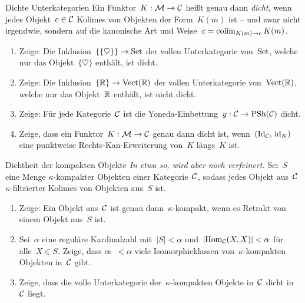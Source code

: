 \documentclass{uebblatt}
\begin{document}

\begin{aufgabe}{Dichte Unterkategorien}
Ein Funktor~$K : \mathcal{M} \to \mathcal{C}$ heißt genau dann \emph{dicht}, wenn jedes Objekt~$c
\in \mathcal{C}$ Kolimes von Objekten der Form~$K(m)$ ist -- und zwar nicht irgendwie,
sondern auf die kanonische Art und Weise~$c = \operatorname*{colim}_{K(m) \to c} K(m)$.
\begin{enumerate}
\item Zeige: Die Inklusion~$\{\{\heartsuit\}\} \to \mathrm{Set}$ der vollen
Unterkategorie von~$\mathrm{Set}$, welche nur das Objekt~$\{\heartsuit\}$ enthält, ist
dicht.
\item Zeige: Die Inklusion~$\{\mathbb{R}\} \to \mathrm{Vect}(\mathbb{R})$ der vollen
Unterkategorie von~$\mathrm{Vect}(\mathbb{R})$, welche nur das Objekt~$\mathbb{R}$ enthält, ist
nicht dicht.
\item Zeige: Für jede Kategorie~$\mathcal{C}$ ist die Yoneda-Einbettung~$y : \mathcal{C} \to
\mathrm{PSh}(\mathcal{C})$ dicht.
\item Zeige, dass ein Funktor~$K : \mathcal{M} \to \mathcal{C}$ genau dann dicht ist,
wenn~$(\mathrm{Id}_{\mathcal{C}},\,\mathrm{id}_K)$ eine punktweise Rechts-Kan-Erweiterung von~$K$
längs~$K$ ist.
\end{enumerate}
\end{aufgabe}

\begin{aufgabe}{Dichtheit der kompakten Objekte}
\emph{In etwa so, wird aber noch verfeinert.}
Sei~$S$ eine Menge $\kappa$-kompakter Objekten einer Kategorie~$\mathcal{C}$, 
sodass jedes Objekt aus~$\mathcal{C}$ $\kappa$-filtrierter Kolimes von Objekten aus~$S$
ist.
\begin{enumerate}
\item Zeige: Ein Objekt aus~$\mathcal{C}$ ist genau dann~$\kappa$-kompakt, wenn es
Retrakt von einem Objekt aus~$S$ ist.
\item Sei~$\alpha$ eine reguläre Kardinalzahl mit~$|S| < \alpha$
und~$|\mathrm{Hom}_{\mathcal{C}}(X,X)| < \alpha$ für alle~$X \in S$. Zeige, dass es~$< \alpha$
viele Isomorphieklassen von~$\kappa$-kompakten Objekten in~$\mathcal{C}$
gibt.
\item Zeige, dass die volle Unterkategorie der~$\kappa$-kompakten Objekte in~$\mathcal{C}$ dicht
in~$\mathcal{C}$ liegt.
\end{enumerate}
%
\end{aufgabe}
\end{document}
